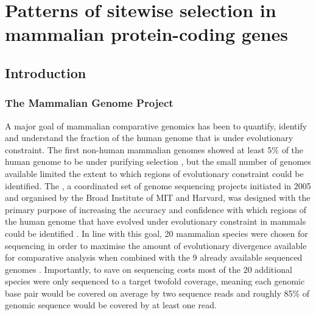 \chapter{Patterns of sitewise selection in mammalian protein-coding genes}\label{ch:mammals1}

\section{Introduction}

\subsection{The Mammalian Genome Project}

A major goal of mammalian comparative genomics has been to quantify,
identify and understand the fraction of the human genome that is under
evolutionary constraint. The first non-human mammalian genomes showed
at least 5\% of the human genome to be under purifying selection
\citep{Mouse2002Initial,Rat2004Genome,LindbladToh2005Genome}, but the
small number of genomes available limited the extent to which regions
of evolutionary constraint could be identified. The \mgp, a
coordinated set of genome sequencing projects initiated in 2005 and
organised by the Broad Institute of MIT and Harvard, was designed with
the primary purpose of increasing the accuracy and confidence with
which regions of the human genome that have evolved under evolutionary
constraint in mammals could be identified \citep{TODO}. In line with
this goal, 20 mammalian species were chosen for sequencing in order to
maximise the amount of evolutionary divergence available for
comparative analysis when combined with the 9 already available
sequenced genomes \citep{Margulies2005Initial}. Importantly, to save
on sequencing costs most of the 20 additional species were only
sequenced to a target twofold coverage, meaning each genomic base pair
would be covered on average by two sequence reads and roughly 85\% of
genomic sequence would be covered by at least one read.

